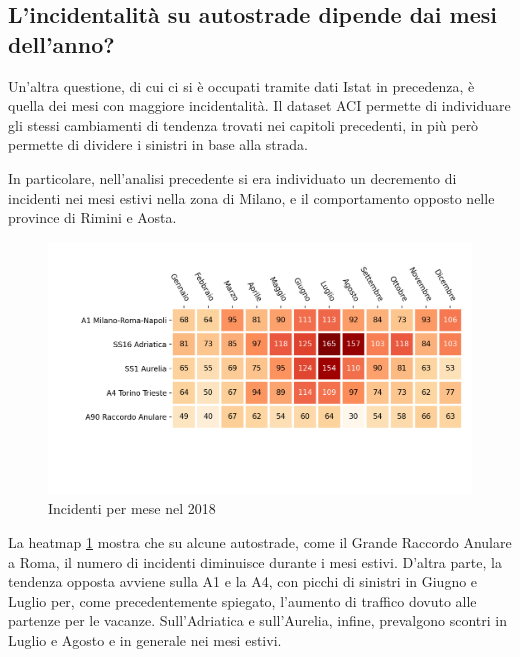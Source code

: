 \documentclass[a4paper,12pt]{report}
\begin{document}
\subsection{L'incidentalità su autostrade dipende dai mesi dell'anno?}

Un'altra questione, di cui ci si è occupati tramite dati Istat in precedenza, è 
quella dei mesi con maggiore incidentalità.
Il dataset ACI permette di individuare gli stessi cambiamenti di tendenza trovati nei 
capitoli precedenti, in più però permette di dividere i sinistri in base alla strada.

In particolare, nell'analisi precedente si era individuato un decremento di incidenti 
nei mesi estivi nella zona di Milano, e il comportamento opposto nelle province di 
Rimini e Aosta.

\begin{figure}
    \includegraphics[width=\linewidth]{../src/incidenti/incidenti_aci/autostrade/mesi_autostrade.png}
    \caption{Incidenti per mese nel 2018}
    \label{fig:incidenti-per-mese}
\end{figure}

La heatmap \ref{fig:incidenti-per-mese} mostra che su alcune autostrade, come il 
Grande Raccordo Anulare a Roma, il numero di incidenti diminuisce durante i mesi 
estivi.
D'altra parte, la tendenza opposta avviene sulla A1 e la A4, 
con picchi di sinistri in Giugno e Luglio per, come precedentemente spiegato, 
l'aumento di traffico dovuto alle partenze per le vacanze.
Sull'Adriatica e sull'Aurelia, infine, prevalgono scontri 
in Luglio e Agosto e in generale nei mesi estivi.
\end{document}
